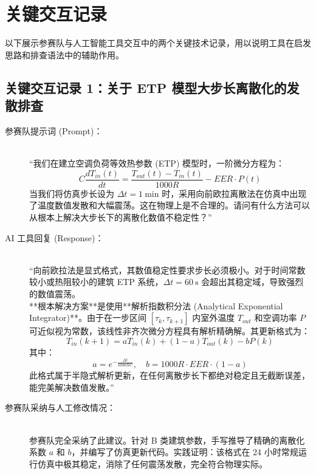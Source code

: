 \documentclass[12pt,a4paper]{article}
\begin{document}
\clearpage

\section{关键交互记录}
以下展示参赛队与人工智能工具交互中的两个关键技术记录，用以说明工具在启发思路和排查语法中的辅助作用。

\subsection{关键交互记录 1：关于 ETP 模型大步长离散化的发散排查}
\begin{description}
    \item[参赛队提示词 (Prompt)：] \ \\
    “我们在建立空调负荷等效热参数 (ETP) 模型时，一阶微分方程为：
    \[ C \frac{dT_{in}(t)}{dt} = \frac{T_{out}(t) - T_{in}(t)}{1000 R} - EER \cdot P(t) \]
    当我们将仿真步长设为 $\Delta t = 1\ \text{min}$ 时，采用向前欧拉离散法在仿真中出现了温度数值发散和大幅震荡。这在物理上是不合理的。请问有什么方法可以从根本上解决大步长下的离散化数值不稳定性？”
    
    \item[AI 工具回复 (Response)：] \ \\
    “向前欧拉法是显式格式，其数值稳定性要求步长必须极小。对于时间常数较小或热阻较小的建筑 ETP 系统，$\Delta t = 60\ \text{s}$ 会超出其稳定域，导致强烈的数值震荡。\\
    **根本解决方案**是使用**解析指数积分法 (Analytical Exponential Integrator)**。由于在一步区间 $[\tau_k, \tau_{k+1}]$ 内室外温度 $T_{out}$ 和空调功率 $P$ 可近似视为常数，该线性非齐次微分方程具有解析精确解。其更新格式为：
    \[ T_{in}(k+1) = a T_{in}(k) + (1-a) T_{out}(k) - b P(k) \]
    其中：
    \[ a = e^{-\frac{\Delta t}{1000 R C}}, \quad b = 1000 R \cdot EER \cdot (1-a) \]
    此格式属于半隐式解析更新，在任何离散步长下都绝对稳定且无截断误差，能完美解决数值发散。”
    
    \item[参赛队采纳与人工修改情况：] \ \\
    参赛队完全采纳了此建议。针对 B 类建筑参数，手写推导了精确的离散化系数 $a$ 和 $b$，并编写了仿真更新代码。实践证明：该格式在 24 小时常规运行仿真中极其稳定，消除了任何震荡发散，完全符合物理实际。
\end{description}

\clearpage
\end{document}
